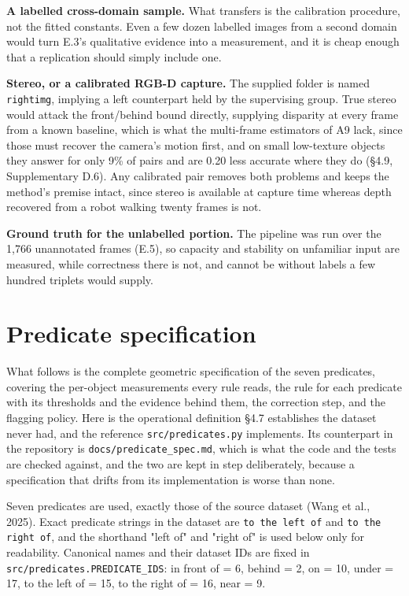 \textbf{A labelled cross-domain sample.} What transfers is the calibration procedure, not the fitted constants. Even a few dozen labelled images from a second domain would turn E.3's qualitative evidence into a measurement, and it is cheap enough that a replication should simply include one.

\textbf{Stereo, or a calibrated RGB-D capture.} The supplied folder is named \texttt{rightimg}, implying a left counterpart held by the supervising group. True stereo would attack the front/behind bound directly, supplying disparity at every frame from a known baseline, which is what the multi-frame estimators of A9 lack, since those must recover the camera's motion first, and on small low-texture objects they answer for only 9\% of pairs and are 0.20 less accurate where they do (\S{}4.9, Supplementary D.6). Any calibrated pair removes both problems and keeps the method's premise intact, since stereo is available at capture time whereas depth recovered from a robot walking twenty frames is not.

\textbf{Ground truth for the unlabelled portion.} The pipeline was run over the 1,766 unannotated frames (E.5), so capacity and stability on unfamiliar input are measured, while correctness there is not, and cannot be without labels a few hundred triplets would supply.


\chapter{Predicate specification}


What follows is the complete geometric specification of the seven predicates, covering the per-object measurements every rule reads, the rule for each predicate with its thresholds and the evidence behind them, the correction step, and the flagging policy. Here is the operational definition \S{}4.7 establishes the dataset never had, and the reference \texttt{src/predicates.py} implements. Its counterpart in the repository is \texttt{docs/predicate\_\allowbreak{}spec.md}, which is what the code and the tests are checked against, and the two are kept in step deliberately, because a specification that drifts from its implementation is worse than none.

Seven predicates are used, exactly those of the source dataset (Wang et al., 2025). Exact predicate strings in the dataset are \texttt{to the left of} and \texttt{to the right of}, and the shorthand "left of" and "right of" is used below only for readability. Canonical names and their dataset IDs are fixed in \texttt{src/predicates.PREDICATE\_\allowbreak{}IDS}: in front of = 6, behind = 2, on = 10, under = 17, to the left of = 15, to the right of = 16, near = 9.

